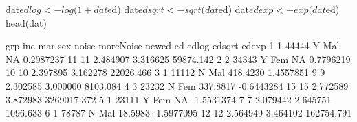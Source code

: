 \begin{Schunk}
\begin{Sinput}
     dat$edlog <- log(1 + dat$ed)
     dat$edsqrt <- sqrt(dat$ed)
     dat$edexp <- exp(dat$ed)
     head(dat)
\end{Sinput}
\begin{Soutput}
  grp   inc mar sex    noise  moreNoise newed ed    edlog   edsqrt       edexp
1   1 44444   Y Mal       NA  0.2987237    11 11 2.484907 3.316625   59874.142
2   2 34343   Y Fem       NA  0.7796219    10 10 2.397895 3.162278   22026.466
3   1 11112   N Mal 418.4230  1.4557851     9  9 2.302585 3.000000    8103.084
4   3 23232   N Fem 337.8817 -0.6443284    15 15 2.772589 3.872983 3269017.372
5   1 23111   Y Fem       NA -1.5531374     7  7 2.079442 2.645751    1096.633
6   1 78787   N Mal  18.5983 -1.5977095    12 12 2.564949 3.464102  162754.791
\end{Soutput}
\end{Schunk}
